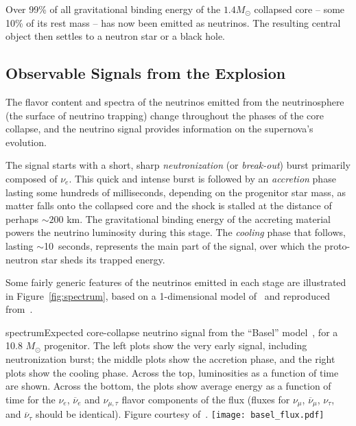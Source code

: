 Over 99\% of all gravitational binding energy of the $1.4 M_{\odot}$ collapsed core -- some 10\% of its rest mass -- has now been emitted as neutrinos. The resulting central object then settles to a neutron star or a black hole. 


\subsection{Observable Signals from the Explosion} %

The flavor content and spectra of the neutrinos emitted from the neutrinosphere (the surface of neutrino trapping) change
throughout the phases of the core collapse, and the neutrino signal provides information on the supernova's evolution.  

The signal starts with a short, sharp
\emph{neutronization} (or \emph{break-out}) burst primarily composed of
$\nu_e$. %
This quick and intense burst is followed by an
\emph{accretion} phase lasting some hundreds of milliseconds, depending on the progenitor star mass, as matter falls onto the collapsed core and the shock is stalled at the distance of perhaps $\sim 200$ km. The gravitational binding energy of the accreting material powers the neutrino luminosity during this stage. The %
\emph{cooling} phase that follows, %
lasting $\sim$10~seconds, represents the main part of
the signal, over which the proto-neutron star sheds its trapped energy.  

Some fairly generic features of the neutrinos emitted in each stage are illustrated in Figure~\ref{fig:spectrum}, based on a 1-dimensional model of~\cite{Fischer:2009af} and reproduced from~\cite{Wurm:2011zn}.
\begin{cdrfigure}{spectrum}{Expected
  core-collapse neutrino signal from the ``Basel''
  model~\cite{Fischer:2009af}, for a
  10.8 $M_{\odot}$ progenitor.  The left plots show the very early
  signal, including neutronization burst; the middle plots show
  the accretion phase, and the right plots show the cooling
  phase. Across the top, luminosities as a function of time are shown. 
  Across the bottom, the plots show average energy as a function of time for the
  $\nu_e$, $\overline{\nu}_e$ and $\nu_{\mu,\tau}$ flavor components of the
  flux (fluxes for $\nu_\mu$, $\overline{\nu}_\mu$, $\nu_\tau$,
  and $\overline{\nu}_\tau$ should be identical).  Figure courtesy of~\cite{Wurm:2011zn}.}
\texttt{[image: basel\_flux.pdf]}
\end{cdrfigure}

